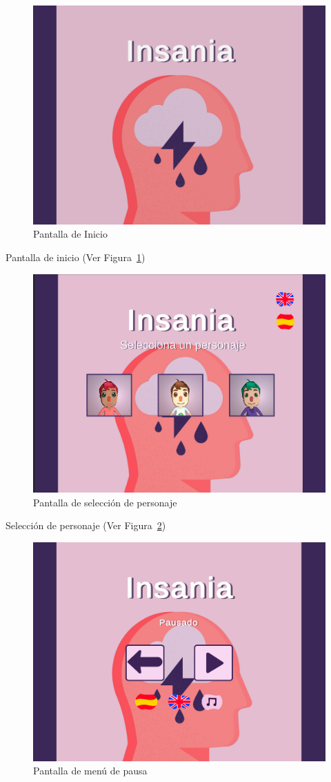 \documentclass[12pt, a4paper,twoside,titlepage]{book}
\begin{document}
\begin{figure}
	\centering
	\includegraphics[width=.8\linewidth]{TGF/Artes/Portada.png}
	\caption{Pantalla de Inicio}
	\label{fig:UXInicio}
\end{figure}


Pantalla de inicio (Ver Figura~\ref{fig:UXInicio})

\begin{figure}
	\centering
	\includegraphics[width=.8\linewidth]{TGF/Artes/Personajes.png}
	\caption{Pantalla de selección de personaje}
	\label{fig:UXSelec}
\end{figure}

Selección de personaje (Ver Figura~\ref{fig:UXSelec})

\begin{figure}
	\centering
	\includegraphics[width=.8\linewidth]{TGF/Artes/Pausa.png}
	\caption{Pantalla de menú de pausa}
	\label{fig:UXPausa}
\end{figure}
\end{document}
